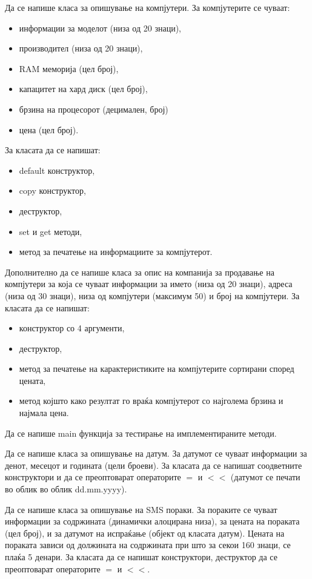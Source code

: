 \documentclass[12pt,a4paper]{exam}
\begin{document}
\begin{questions}
\question
Да се напише класа за опишување на компјутери. За компјутерите се чуваат:
\begin{itemize}
  \item информации за моделот (низа од 20 знаци),
  \item производител (низа од 20 знаци),
  \item RAM меморија (цел број),
  \item капацитет на хард диск (цел број),
  \item брзина на процесорот (децимален,
број)
\item цена (цел број).
\end{itemize}
За класата да се напишат:
\begin{itemize}
  \item default конструктор,
  \item copy конструктор,
  \item деструктор,
  \item set и get методи,
  \item метод за печатење на информациите за компјутерот.
\end{itemize}
Дополнително да се напише класа за опис на компанија за продавање на компјутери
за која се чуваат информации за името (низа од 20 знаци), адреса (низа од 30
знаци), низа од компјутери (максимум 50) и број на компјутери. За класата да се
напишат: 
\begin{itemize}
  \item конструктор со 4 аргументи,
  \item деструктор,
  \item метод за печатење на карактеристиките на компјутерите сортирани според
  цената,
  \item метод којшто како резултат го враќа компјутерот со најголема брзина и најмала
цена.
\end{itemize}
Да се напише main функција за тестирање на имплементираните методи.

\question

Да се напише класа за опишување на датум. За датумот се чуваат информации за
денот, месецот и годината (цели броеви). За класата да се напишат соодветните
конструктори и да се преоптоварат операторите $=$ и $<<$ (датумот се печати во
облик во облик dd.mm.yyyy).

Да се напише класа за опишување на SMS пораки. За пораките се чуваат информации
за содржината (динамички алоцирана низа), за цената на пораката (цел број), и за
датумот на испраќање (објект од класата датум). Цената на пораката зависи од
должината на содржината при што за секои 160 знаци, се плаќа 5 денари. За
класата да се напишат конструктори, деструктор да се преоптоварат операторите
$=$ и $<<$.


\end{questions}
\end{document}
